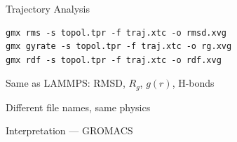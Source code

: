 \begin{frame}[fragile]{Trajectory Analysis}
  \begin{verbatim}
gmx rms -s topol.tpr -f traj.xtc -o rmsd.xvg
gmx gyrate -s topol.tpr -f traj.xtc -o rg.xvg
gmx rdf -s topol.tpr -f traj.xtc -o rdf.xvg
  \end{verbatim}
  \begin{pitemize}
    \item Same as LAMMPS: RMSD, $R_g$, $g(r)$, H-bonds
    \item Different file names, same physics
  \end{pitemize}
\end{frame}

\begin{frame}{Interpretation --- GROMACS}
\end{frame}

